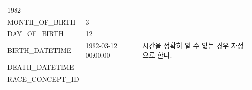 \documentclass[10.5pt]{book}
\theoremstyle{definition}
\theoremstyle{definition}
\theoremstyle{definition}
\theoremstyle{remark}
\begin{document}
\begin{longtable}[]{@{}lll@{}}
\begin{minipage}[t]{0.16\columnwidth}
1982\strut
\end{minipage} & \begin{minipage}[t]{0.48\columnwidth}\raggedright\strut
\strut
\end{minipage}\tabularnewline
\begin{minipage}[t]{0.28\columnwidth}\raggedright\strut
MONTH\_OF\_BIRTH\strut
\end{minipage} & \begin{minipage}[t]{0.16\columnwidth}\raggedright\strut
3\strut
\end{minipage} & \begin{minipage}[t]{0.48\columnwidth}\raggedright\strut
\strut
\end{minipage}\tabularnewline
\begin{minipage}[t]{0.28\columnwidth}\raggedright\strut
DAY\_OF\_BIRTH\strut
\end{minipage} & \begin{minipage}[t]{0.16\columnwidth}\raggedright\strut
12\strut
\end{minipage} & \begin{minipage}[t]{0.48\columnwidth}\raggedright\strut
\strut
\end{minipage}\tabularnewline
\begin{minipage}[t]{0.28\columnwidth}\raggedright\strut
BIRTH\_DATETIME\strut
\end{minipage} & \begin{minipage}[t]{0.16\columnwidth}\raggedright\strut
1982-03-12 00:00:00\strut
\end{minipage} & \begin{minipage}[t]{0.48\columnwidth}\raggedright\strut
시간을 정확히 알 수 없는 경우 자정으로 한다.\strut
\end{minipage}\tabularnewline
\begin{minipage}[t]{0.28\columnwidth}\raggedright\strut
DEATH\_DATETIME\strut
\end{minipage} & \begin{minipage}[t]{0.16\columnwidth}\raggedright\strut
\strut
\end{minipage} & \begin{minipage}[t]{0.48\columnwidth}\raggedright\strut
\strut
\end{minipage}\tabularnewline
\begin{minipage}[t]{0.28\columnwidth}\raggedright\strut
RACE\_CONCEPT\_ID\strut
\end{minipage} & \begin{minipage}[t]{0.16\columnwidth}\raggedright\strut

\end{minipage}
\end{longtable}
\end{document}
